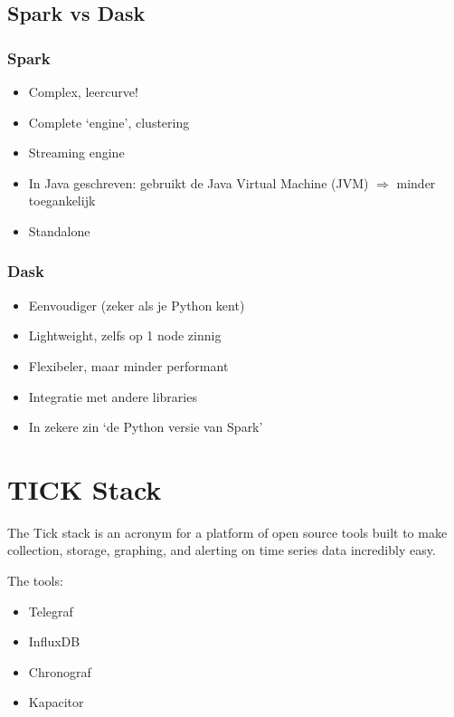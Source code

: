 \documentclass{article}
\begin{document}
\subsection{Spark vs Dask}
\subsubsection{Spark}

\begin{itemize}
    \item Complex, leercurve!
    \item Complete `engine', clustering
    \item Streaming engine
    \item In Java geschreven: gebruikt de Java Virtual Machine (JVM) $\Rightarrow$ minder toegankelijk
    \item Standalone
\end{itemize}

\subsubsection{Dask}

\begin{itemize}
    \item Eenvoudiger (zeker als je Python kent)
    \item Lightweight, zelfs op 1 node zinnig
    \item Flexibeler, maar minder performant
    \item Integratie met andere libraries
    \item In zekere zin `de Python versie van Spark'
\end{itemize}

\section{TICK Stack}

The Tick stack is an acronym for a platform of open source tools 
built to make collection, storage, graphing, and alerting on 
time series data incredibly easy.

The tools:

\begin{itemize}
    \item Telegraf
    \item InfluxDB
    \item Chronograf
    \item Kapacitor
\end{itemize}
\end{document}
